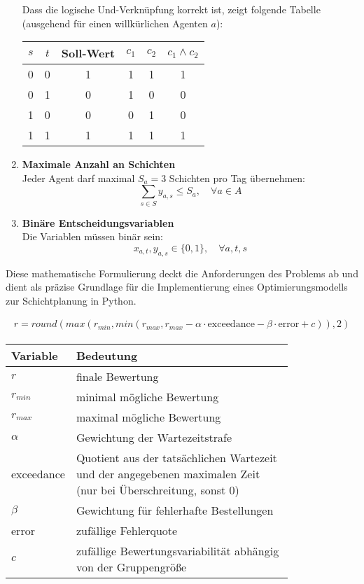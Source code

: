 \begin{enumerate}
        Dass die logische Und-Verknüpfung korrekt ist, zeigt folgende Tabelle (ausgehend für einen willkürlichen Agenten $a$):
        \begin{center}
            \begin{tabular}{|c|c|c||c|c||c|}
                \hline
                $s$ & $t$ & Soll-Wert & $c_1$ & $c_2$ & $c_1 \land c_2$ \\
                \hline
                \hline
                0 & 0 & 1 & 1 & 1 & 1 \\
                \hline
                0 & 1 & 0 & 1 & 0 & 0 \\
                \hline
                1 & 0 & 0 & 0 & 1 & 0 \\
                \hline
                1 & 1 & 1 & 1 & 1 & 1 \\
                \hline
            \end{tabular}
        \end{center}

    \item \textbf{Maximale Anzahl an Schichten}\\
        Jeder Agent darf maximal $S_a = 3$ Schichten pro Tag übernehmen:
        $$\sum_{s \in S} y_{a,s} \leq S_a,\quad\forall a\in A$$
    \item \textbf{Binäre Entscheidungsvariablen}\\
        Die Variablen müssen binär sein:
        $$x_{a,t}, y_{a,s} \in \{0,1\},\quad\forall a,t,s$$
\end{enumerate}

Diese mathematische Formulierung deckt die Anforderungen des Problems ab und dient als präzise Grundlage für die Implementierung eines Optimierungsmodells zur Schichtplanung in Python.


\begin{align*}
    r = round(max(r_{min}, min(r_{max}, r_{max} - \alpha \cdot \text{exceedance} - \beta \cdot \text{error} + c)), 2)
\end{align*}

\begin{longtable}{|l|p{0.8\linewidth}|}
    \hline
    \textbf{Variable} & \textbf{Bedeutung} \\
    \hline
    $r$ & finale Bewertung\\
    \hline
    $r_{min}$ & minimal mögliche Bewertung\\
    \hline
    $r_{max}$ & maximal mögliche Bewertung\\
    \hline
    $\alpha$ & Gewichtung der Wartezeitstrafe\\
    \hline
    exceedance & Quotient aus der tatsächlichen Wartezeit und der angegebenen maximalen Zeit (nur bei Überschreitung, sonst 0)\\
    \hline
    $\beta$ & Gewichtung für fehlerhafte Bestellungen\\
    \hline
    error & zufällige Fehlerquote\\
    \hline
    $c$ & zufällige Bewertungsvariabilität abhängig von der Gruppengröße\\
    \hline
\end{longtable}

